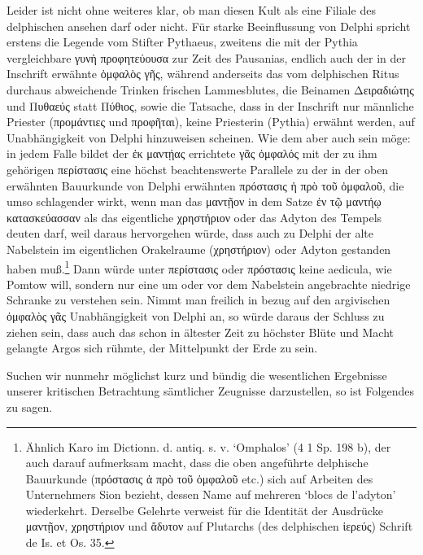 \documentclass[a4paper, 11pt, oneside]{article}
\begin{document}
Leider ist nicht ohne weiteres klar, ob man diesen Kult als eine Filiale des delphischen ansehen darf oder nicht. Für starke Beeinflussung von Delphi spricht erstens die Legende vom Stifter Pythaeus, zweitens die mit der Pythia vergleichbare γυνὴ προφητεύουσα zur Zeit des Pausanias, endlich auch der in der Inschrift erwähnte ὀμφαλὸς γῆς, während anderseits das vom delphischen Ritus durchaus abweichende Trinken frischen Lammesblutes, die Beinamen Δειραδιώτης und Πυθαεύς statt Πύθιος, sowie die Tatsache, dass in der Inschrift nur männliche Priester (προμάντιες und προφῆται), keine Priesterin (Pythia) erwähnt werden, auf Unabhängigkeit von Delphi hinzuweisen scheinen. Wie dem aber auch sein möge: in jedem Falle bildet der ἐκ μαντῄας errichtete γᾶς ὀμφαλός mit der zu ihm gehörigen περίστασις eine höchst beachtenswerte Parallele zu der in der oben erwähnten Bauurkunde von Delphi erwähnten πρόστασις ἡ πρὸ τοῦ ὀμφαλοῦ, die umso schlagender wirkt, wenn man das μαντῇον in dem Satze ἐν τῷ μαντήῳ κατασκεύασσαν als das eigentliche χρηστήριον oder das Adyton des Tempels deuten darf, weil daraus hervorgehen würde, dass auch zu Delphi der alte Nabelstein im eigentlichen Orakelraume (χρηστήριον) oder Adyton gestanden haben muß.\footnote{Ähnlich Karo im Dictionn. d. antiq. s. v. `Omphalos' (4 1 Sp. 198 b), der auch darauf aufmerksam macht, dass die oben angeführte delphische Bauurkunde (πρόστασις ἁ πρὸ τοῦ ὀμφαλοῦ etc.) sich auf Arbeiten des Unternehmers Sion bezieht, dessen Name auf mehreren `blocs de l'adyton' wiederkehrt. Derselbe Gelehrte verweist für die Identität der Ausdrücke μαντῇον, χρηστήριον und ἄδυτον auf Plutarchs (des delphischen ἱερεύς) Schrift de Is. et Os. 35.} Dann würde unter περίστασις oder πρόστασις keine aedicula, wie Pomtow will, sondern nur eine um oder vor dem Nabelstein angebrachte niedrige Schranke zu verstehen sein. Nimmt man freilich in bezug auf den argivischen ὀμφαλὸς γᾶς Unabhängigkeit von Delphi an, so würde daraus der Schluss zu ziehen sein, dass auch das schon in ältester Zeit zu höchster Blüte und Macht gelangte Argos sich rühmte, der Mittelpunkt der Erde zu sein.

Suchen wir nunmehr möglichst kurz und bündig die wesentlichen Ergebnisse unserer kritischen Betrachtung sämtlicher Zeugnisse darzustellen, so ist Folgendes zu sagen.
\end{document}
